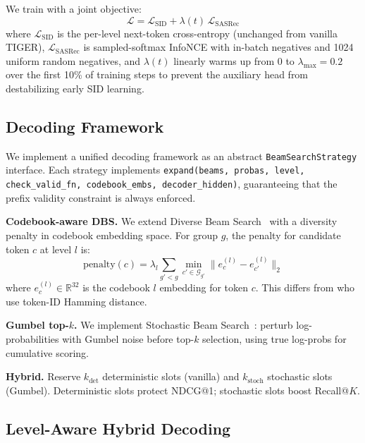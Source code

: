 We train with a joint objective:
%
\begin{equation}
  \mathcal{L} = \mathcal{L}_{\text{SID}} + \lambda(t)\,\mathcal{L}_{\text{SASRec}}
\end{equation}
%
where $\mathcal{L}_{\text{SID}}$ is the per-level next-token cross-entropy (unchanged from vanilla TIGER), $\mathcal{L}_{\text{SASRec}}$ is sampled-softmax InfoNCE with in-batch negatives and 1024 uniform random negatives, and $\lambda(t)$ linearly warms up from 0 to $\lambda_{\max} = 0.2$ over the first 10\% of training steps to prevent the auxiliary head from destabilizing early SID learning.

\subsection{Decoding Framework}
\label{sec:decoding}

We implement a unified decoding framework as an abstract \texttt{BeamSearchStrategy} interface. Each strategy implements \texttt{expand(beams, probas, level, check\_valid\_fn, codebook\_embs, decoder\_hidden)}, guaranteeing that the prefix validity constraint is always enforced.

\textbf{Codebook-aware DBS.} We extend Diverse Beam Search~\cite{vijayakumar2016dbs} with a diversity penalty in codebook embedding space. For group $g$, the penalty for candidate token $c$ at level $l$ is:
%
\begin{equation}
  \text{penalty}(c) = \lambda_l \sum_{g' < g} \min_{c' \in \mathcal{G}_{g'}} \|e_c^{(l)} - e_{c'}^{(l)}\|_2
\end{equation}
%
where $e_c^{(l)} \in \mathbb{R}^{32}$ is the codebook $l$ embedding for token $c$. This differs from \citet{penha2024bridging} who use token-ID Hamming distance.

\textbf{Gumbel top-$k$.} We implement Stochastic Beam Search~\cite{kool2019stochastic}: perturb log-probabilities with Gumbel noise before top-$k$ selection, using true log-probs for cumulative scoring.

\textbf{Hybrid.} Reserve $k_{\text{det}}$ deterministic slots (vanilla) and $k_{\text{stoch}}$ stochastic slots (Gumbel). Deterministic slots protect NDCG@1; stochastic slots boost Recall@$K$.

\subsection{Level-Aware Hybrid Decoding}

